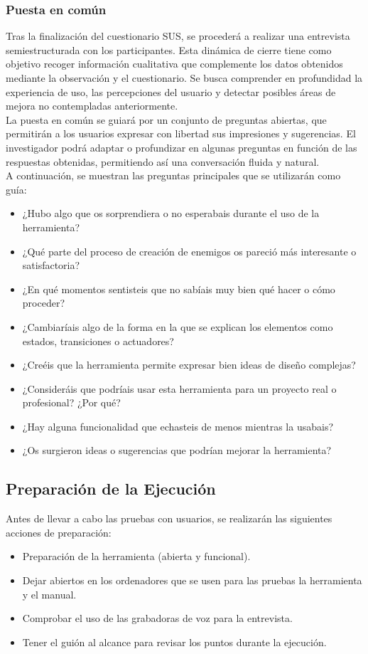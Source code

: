 \subsubsection{Puesta en común}
Tras la finalización del cuestionario SUS, se procederá a realizar una entrevista semiestructurada con los participantes. Esta dinámica de cierre tiene como objetivo recoger información cualitativa que complemente los datos obtenidos mediante la observación y el cuestionario. Se busca comprender en profundidad la experiencia de uso, las percepciones del usuario y detectar posibles áreas de mejora no contempladas anteriormente.\\

La puesta en común se guiará por un conjunto de preguntas abiertas, que permitirán a los usuarios expresar con libertad sus impresiones y sugerencias. El investigador podrá adaptar o profundizar en algunas preguntas en función de las respuestas obtenidas, permitiendo así una conversación fluida y natural.\\

A continuación, se muestran las preguntas principales que se utilizarán como guía:

\begin{itemize}
\item ¿Hubo algo que os sorprendiera o no esperabais durante el uso de la herramienta?
\item ¿Qué parte del proceso de creación de enemigos os pareció más interesante o satisfactoria?
\item ¿En qué momentos sentisteis que no sabíais muy bien qué hacer o cómo proceder?
\item ¿Cambiaríais algo de la forma en la que se explican los elementos como estados, transiciones o actuadores?
\item ¿Creéis que la herramienta permite expresar bien ideas de diseño complejas?
\item ¿Consideráis que podríais usar esta herramienta para un proyecto real o profesional? ¿Por qué?
\item ¿Hay alguna funcionalidad que echasteis de menos mientras la usabais?
\item ¿Os surgieron ideas o sugerencias que podrían mejorar la herramienta?
\end{itemize}

\subsection{Preparación de la Ejecución}
Antes de llevar a cabo las pruebas con usuarios, se realizarán las siguientes acciones de preparación:
\begin{itemize}
\item Preparación de la herramienta (abierta y funcional).
\item Dejar abiertos en los ordenadores que se usen para las pruebas la herramienta y el manual.
\item Comprobar el uso de las grabadoras de voz para la entrevista.
\item Tener el guión al alcance para revisar los puntos durante la ejecución.
\end{itemize}
